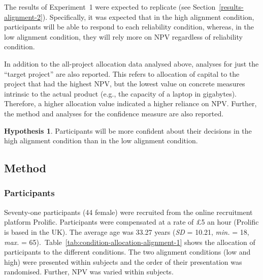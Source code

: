 \documentclass[a4paper, nobind]{templates/ociamthesis}
\theoremstyle{definition}
\theoremstyle{definition}
\theoremstyle{definition}
\theoremstyle{definition}
\newtheorem{hypothesis}{Hypothesis}[chapter]
\theoremstyle{remark}
\begin{document}
The results of Experiment~1 were expected to replicate (see
Section~\ref{results-alignment-2}). Specifically, it was expected that in the
high alignment condition, participants will be able to respond to each
reliability condition, whereas, in the low alignment condition, they will rely
more on NPV regardless of reliability condition.

In addition to the all-project allocation data analysed above, analyses for just
the ``target project'' are also reported. This refers to allocation of capital to
the project that had the highest NPV, but the lowest value on concrete measures
intrinsic to the actual product (e.g., the capacity of a laptop in gigabytes).
Therefore, a higher allocation value indicated a higher reliance on NPV.
Further, the method and analyses for the confidence measure are also reported.

\begin{hypothesis}
\protect\hypertarget{hyp:confidence-alignment-alignment-1}{}{\label{hyp:confidence-alignment-alignment-1} }Participants will be more confident about their decisions in the high alignment
condition than in the low alignment condition.
\end{hypothesis}

\hypertarget{method-alignment-1}{%
\subsection{Method}\label{method-alignment-1}}

\subsubsection{Participants}

Seventy-one participants (44 female) were recruited from the online recruitment platform Prolific. Participants were compensated at a rate of \pounds 5 an hour (Prolific is based in the UK). The average age was 33.27 years (\emph{SD} = 10.21, \emph{min.} = 18, \emph{max.} = 65).~Table~\ref{tab:condition-allocation-alignment-1}
shows the allocation of participants to the different conditions. The two alignment conditions
(low and high) were presented within subjects and the order of their
presentation was randomised. Further, NPV was varied within subjects.
\end{document}
